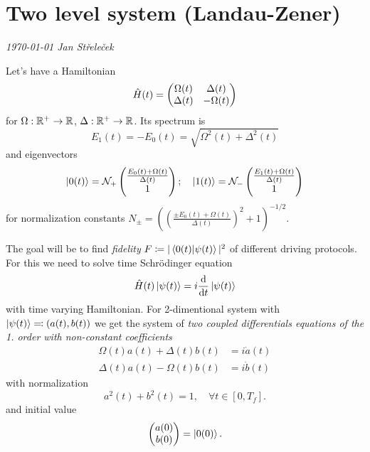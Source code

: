 \chapter{Two level system (Landau-Zener)}
\textit{\today\newline
Jan Střeleček\newline}




Let's have a Hamiltonian
\begin{equation}
    \hat{H}(t)=\begin{pmatrix}
        \Omega(t)&\Delta(t)\\
        \Delta(t)&-\Omega(t)
    \end{pmatrix}
\end{equation}
for $\Omega: \mathbb{R}^+\rightarrow \mathbb{R}$, $\Delta: \mathbb{R}^+\rightarrow \mathbb{R}$. Its spectrum is
\begin{equation}
    E_1(t)=-E_0(t)= \sqrt{\Omega^2(t)+\Delta^2(t)}
    \label{eq:energy}
\end{equation}
and eigenvectors
\begin{equation}
\ket{0(t)}=\mathcal N_+ \begin{pmatrix}
 \frac{E_0(t)+\Omega(t)}{\Delta(t)} \\ 1
\end{pmatrix};\quad \ket{1(t)}=\mathcal N_-\begin{pmatrix}
    \frac{E_1(t)+\Omega(t)}{\Delta(t)} \\ 1
   \end{pmatrix}
   \label{eq:eigenvectors}
\end{equation}
for normalization constants $N_\pm=\left(\left(\frac{\pm E_0(t)+\Omega(t)}{\Delta(t)}\right)^2+1\right)^{-1/2}$.

The goal will be to find \emph{fidelity} $F\coloneqq |\braket{0(t)|\psi(t)}|^2$ of different driving protocols. For this we need to solve time Schr\"odinger equation
\begin{equation}
    \hat{H}(t)\ket{\psi(t)}=i\frac{\mathrm{d}}{\mathrm{d} t}\ket{\psi(t)}
\end{equation}
with time varying Hamiltonian. For 2-dimentional system with $\ket{\psi(t)}\eqqcolon (a(t),b(t))$ we get the system of \emph{two coupled differentials equations of the 1. order with non-constant coefficients}
\begin{align}
    \Omega(t)a(t)+\Delta(t)b(t)&=i\dot a(t)\label{eq:a1}\\
    \Delta(t)a(t)-\Omega(t)b(t)&=i\dot b(t)
    \label{eq:a2}
\end{align}
with normalization
\begin{equation}
    a^2(t)+b^2(t)=1, \quad \forall t\in [0,T_f].
    \label{eq:normalizationCondition}
\end{equation}
and initial value 
\begin{equation}
    \begin{pmatrix}
        a(0)\\b(0)
    \end{pmatrix} = \ket{0(0)}.
\end{equation}

